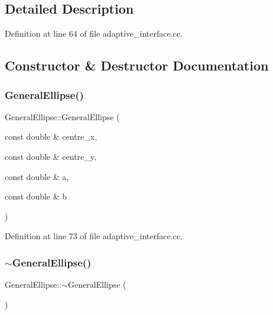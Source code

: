 \subsection{Detailed Description}


Definition at line 64 of file adaptive\+\_\+interface.\+cc.



\subsection{Constructor \& Destructor Documentation}
\mbox{\label{classGeneralEllipse_a50dc036d709bcd1d53eafb62b5548f67}} 
\subsubsection{\texorpdfstring{General\+Ellipse()}{GeneralEllipse()}}
{\footnotesize\ttfamily General\+Ellipse\+::\+General\+Ellipse (\begin{DoxyParamCaption}\item[{const double \&}]{centre\+\_\+x,  }\item[{const double \&}]{centre\+\_\+y,  }\item[{const double \&}]{a,  }\item[{const double \&}]{b }\end{DoxyParamCaption})\hspace{0.3cm}{\ttfamily [inline]}}



Definition at line 73 of file adaptive\+\_\+interface.\+cc.

\mbox{\label{classGeneralEllipse_a3ac5c17cf8c4998f1b74913860cb3bb9}} 
\subsubsection{\texorpdfstring{$\sim$\+General\+Ellipse()}{~GeneralEllipse()}}
{\footnotesize\ttfamily General\+Ellipse\+::$\sim$\+General\+Ellipse (\begin{DoxyParamCaption}{ }\end{DoxyParamCaption})\hspace{0.3cm}{\ttfamily [inline]}}



